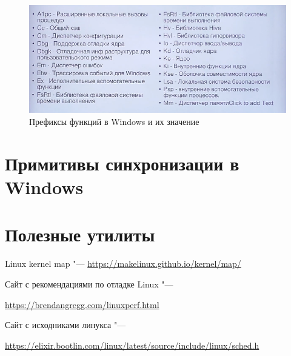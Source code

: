 \documentclass[bachelor, och, book]{SCWorks}
\theoremstyle{remark}
\begin{document}
    \begin{figure}[H]
        \begin{center}
            \includegraphics[scale=0.6]{res/prefix-function-windows.png}
            \caption{Префиксы функций в Windows и их значение}
        \end{center}
    \end{figure}

    \section{Примитивы синхронизации в Windows}

    \section{Полезные утилиты}

    Linux kernel map "--- \href{https://makelinux.github.io/kernel/map/}{https://makelinux.github.io/kernel/map/}

    Сайт с рекомендациями  по отладке Linux "--- 
    
    \href{https://brendangregg.com/linuxperf.html}{https://brendangregg.com/linuxperf.html}

    Сайт с исходниками линукса "--- 
    
    \href{https://elixir.bootlin.com/linux/latest/source/include/linux/sched.h}{https://elixir.bootlin.com/linux/latest/source/include/linux/sched.h}
\end{document}
